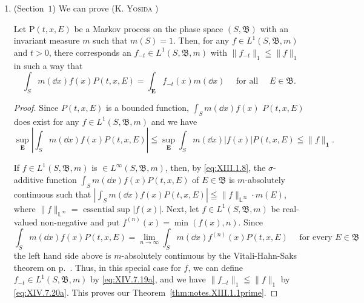 \label{notes:XIII}
\setcounter{equation}{18}

\begin{enumerate}[1.]
\item (Section~\hyperref[sec:XIII.1]{$1$}) We can prove (K. \textsc{Yosida} \cite{yosida360}) 

\begin{theoremn}\label{thm:notes.XIII.1.1prime} Let $\mathrm{P}(t, x, E)$ be a Markov process on the phase space $(S, \mathfrak{B})$ with an invariant measure $m$ such that $m(S) = 1$. Then, for any $f \in L^1(S, \mathfrak{B}, m)$ and $t > 0$, there corresponds an $f_{-t} \in L^1(S, \mathfrak{B}, m)$ with $\|f_{-t}\|_1 \leqq \|f\|_1$ in such a way that 
\begin{equation}\label{eq:XIV.7.19a}
\int_{S} m (\dd x) f (x) P (t, x, E) = \int_ {\boldsymbol {E}} f _{-t} (x) m (\dd x) \quad \text{ for all } \quad E \in \mathfrak {B}.
\end{equation}
\end{theoremn}

\begin{proof}
 Since $P(t, x, E)$ is a bounded function, $\int_{S} m(\dd x) f(x)$ $P(t, x, E)$ does exist for any $f \in L^{1}(S, \mathfrak{B}, m)$ and we have 
\begin{equation}\label{eq:XIV.7.20a}
\sup\limits _ {\boldsymbol {E}} | \int_{S} m (\dd x) f (x) P (t, x, E) | \leqq \sup\limits _ {\boldsymbol {E}} \int_{S} m (\dd x) | f (x) | P (t, x, E) \leqq \| f \| _ {\mathbf {1}}. \end{equation}

If $f \in L^{1}(S, \mathfrak{B}, m)$ is $\in L^{\infty}(S, \mathfrak{B}, m)$, then, by \eqref{eq:XIII.1.8}, the $\sigma$-additive function $\int_{S} m(\dd x)f(x)P(t, x, E)$ of $E \in \mathfrak{B}$ is $m$-absolutely continuous such that $|\int_{S} m(\dd x)f(x)P(t, x, E)| \leqq \|f\|_{\mathbb{L}^{\infty}} \cdot m(E)$, where $\|f\|_{\mathbb{L}^{\infty}} = \text{ essential sup } |f(x)|$. Next, let $f \in L^{1}(S, \mathfrak{B}, m)$ be real-valued non-negative and put $f^{(n)}(x) = \min(f(x), n)$. Since 
\[
\int_{S} m (\dd x) f (x) P (t, x, E) = \lim\limits _{n \rightarrow \infty} \int_{S} m (\dd x) f ^{(n)} (x) P (t, x, E) \quad \text{ for every } E \in \mathfrak {B}
\]
the left hand side above is $m$-absolutely continuous by the Vitali-Hahn-Saks theorem on p.~\pageref{thm:II.2.VitaliHahnSaks}. Thus, in this special case for $f$, we can define $f_{-t} \in L^{1}(S, \mathfrak{B}, m)$ by \eqref{eq:XIV.7.19a}, and we have $\|f_{-t}\|_{1} \leqq \|f\|_{1}$ by \eqref{eq:XIV.7.20a}. This proves our Theorem~\ref{thm:notes.XIII.1.1prime}. 
\end{proof}


\end{enumerate}

